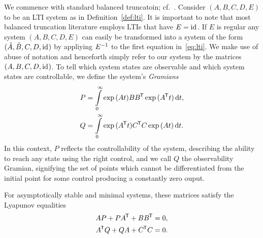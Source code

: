 We commence with standard balanced truncatoin; cf.~\cite{BB2017}.
Consider $(A, B, C, D, E)$ to be an LTI system as in Definition~\ref{def:lti}.
It is important to note that most balanced truncation literature employs LTIs that have $E = \text{id}_{}$.
If $E$ is regular any system $(A, B, C, D, E)$ can easily be transformed into a system of the form $(\tilde{A}, \tilde{B}, C, D, \text{id}_{})$ by appliying $E^{-1}$ to the first equation in~\eqref{eq:lti}.
We make use of abuse of notation and henceforth simply refer to our system by the matrices $(A, B, C, D, \text{id}_{})$.
To tell which system states are observable and which system states are controllable, we define the system's \emph{Gramians}
\begin{align}
    P &= \int\limits_0^\infty \exp{(A t)} B B^{\mkern-1.5mu \mathsf{T}} \exp{(A^{\mkern-1.5mu \mathsf{T}}t)} \mathop{}\!\mathrm{d} t,\label{eq:controllability-gramian} \\
    Q &= \int\limits_0^\infty \exp{(A^{\mkern-1.5mu \mathsf{T}}t)} C^{\mkern-1.5mu \mathsf{T}} C \exp{(A t)} \mathop{}\!\mathrm{d} t.\label{eq:observability-gramian}
\end{align}
In this context, $P$ reflects the controllability of the system, describing the ability to reach any state using the right control, and we call $Q$ the observability Gramian, signifying the set of points which cannot be differentiated from the initial point for some control producing a constantly zero ouput.



For asymptotically stable and minimal systems, these matrices satisfy the Lyapunov equalities
\begin{equation}\label{eq:lyapunov-equations}
    \begin{aligned}
        A P + P A^{\mkern-1.5mu \mathsf{T}} + B B^{\mkern-1.5mu \mathsf{T}} &= 0, \\
        A^{\mkern-1.5mu \mathsf{T}} Q + Q A + C^{\mkern-1.5mu \mathsf{T}} C &= 0.
    \end{aligned}
\end{equation}


